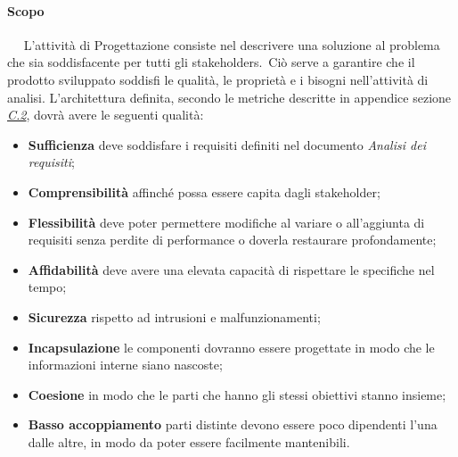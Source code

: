 	    \paragraph{Scopo}~\newline ~\newline
	    L'attività di Progettazione consiste nel descrivere una soluzione al problema che sia soddisfacente per tutti gli stakeholders\pedice.~Ciò serve a garantire che il prodotto sviluppato soddisfi le qualità, le proprietà e i bisogni nell'attività di analisi. L'architettura definita, secondo le metriche descritte in appendice sezione \textit{\underline{C.2}}, dovrà avere le seguenti qualità:
	    \begin{itemize}
	        \item \textbf{Sufficienza} deve soddisfare i requisiti definiti nel documento \textit{Analisi dei requisiti};
	        \item \textbf{Comprensibilità} affinché possa essere capita dagli stakeholder;
	        \item \textbf{Flessibilità} deve  poter  permettere  modifiche  al  variare  o  all’aggiunta  di requisiti senza perdite di performance o doverla restaurare profondamente;
	        \item \textbf{Affidabilità} deve avere una elevata capacità di rispettare le specifiche nel tempo;
	        \item \textbf{Sicurezza} rispetto ad intrusioni e malfunzionamenti;
	        \item \textbf{Incapsulazione} le componenti dovranno essere progettate in modo che le informazioni interne siano nascoste;
	        \item \textbf{Coesione} in modo che le parti che hanno gli stessi obiettivi stanno insieme;
	        \item \textbf{Basso accoppiamento} parti distinte devono essere poco dipendenti l’una dalle altre, in modo da poter essere facilmente mantenibili.
	    \end{itemize}
	    

